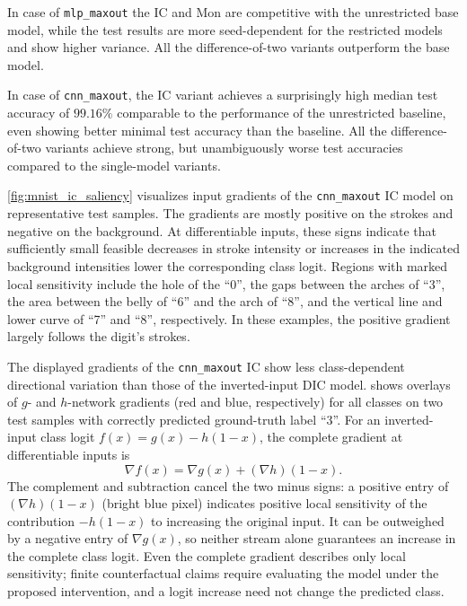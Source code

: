 In case of \texttt{mlp\_maxout} the IC and Mon are competitive with the unrestricted base model, while the test results are more seed-dependent for the restricted models and show higher variance. All the difference-of-two variants outperform the base model.

In case of \texttt{cnn\_maxout}, the IC variant achieves a surprisingly high median test accuracy of $99.16 \%$ comparable to the performance of the unrestricted baseline, even showing better minimal test accuracy than the baseline.
All the difference-of-two variants achieve strong, but unambiguously worse test accuracies compared to the single-model variants.



\cref{fig:mnist_ic_saliency} visualizes input gradients of the \texttt{cnn\_maxout} IC model on representative test samples.
The gradients are mostly positive on the strokes and negative on the background. At differentiable inputs, these signs indicate that sufficiently small feasible decreases in stroke intensity or increases in the indicated background intensities lower the corresponding class logit.
Regions with marked local sensitivity include the hole of the ``0'', the gaps between the arches of ``3'', the area between the belly of ``6'' and the arch of ``8'', and the vertical line and lower curve of ``7'' and ``8'', respectively.
In these examples, the positive gradient largely follows the digit's strokes.

The displayed gradients of the \texttt{cnn\_maxout} IC show less class-dependent directional variation than those of the inverted-input DIC model.
 shows overlays of $g$- and $h$-network gradients (red and blue, respectively) for all classes on two test samples with correctly predicted ground-truth label ``3''.
For an inverted-input class logit $f(x)=g(x)-h(1-x)$, the complete gradient at differentiable inputs is
\[
\nabla f(x)=\nabla g(x)+(\nabla h)(1-x).
\]
The complement and subtraction cancel the two minus signs: a positive entry of $(\nabla h)(1-x)$ (bright blue pixel) indicates positive local sensitivity of the contribution $-h(1-x)$ to increasing the original input. It can be outweighed by a negative entry of $\nabla g(x)$, so neither stream alone guarantees an increase in the complete class logit. Even the complete gradient describes only local sensitivity; finite counterfactual claims require evaluating the model under the proposed intervention, and a logit increase need not change the predicted class.

